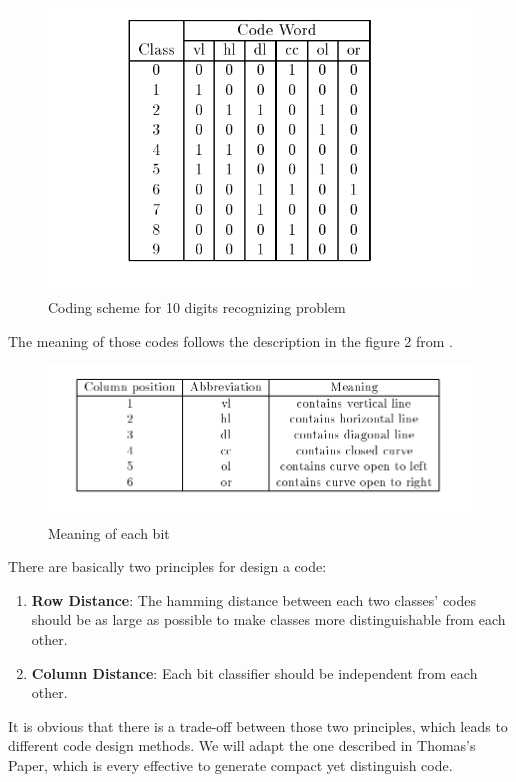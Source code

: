 \begin{figure}[!htbp]
\centering
\includegraphics[bb=0 0 680 500,scale=.3]{FIG/code.png}
\caption{Coding scheme for 10 digits recognizing problem}
\end{figure}

The meaning of those codes follows the description in the figure 2 from \cite{Thomas1995}.


\begin{figure}[!htbp]
\centering
\includegraphics[bb=0 0 860 300,scale=.3]{FIG/meaning.png}
\caption{Meaning of each bit}
\end{figure}

There are basically two principles for design a code\cite{Thomas1995}:
\begin{enumerate}
    \item \textbf{Row Distance}: The hamming distance between each two classes' codes should be as large as possible to make classes more distinguishable from each other.
    \item \textbf{Column Distance}: Each bit classifier should be independent from each other.
\end{enumerate}

It is obvious that there is a trade-off between those two principles, which leads to different code design methods. We will adapt the one described in Thomas's Paper\cite{Thomas1995}, which is every effective to generate compact yet distinguish code.

